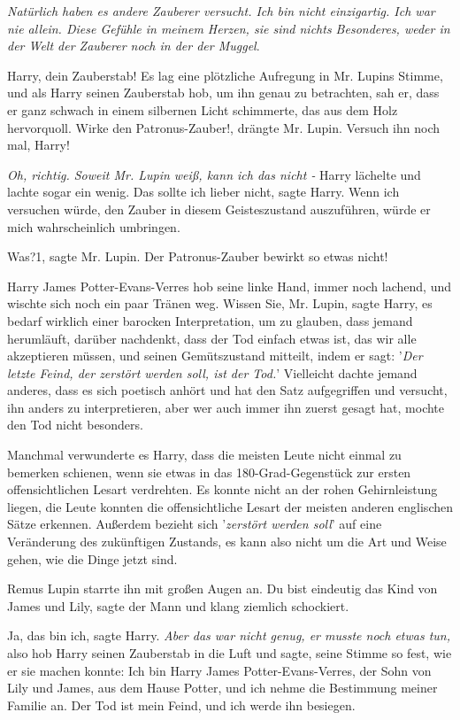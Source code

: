 \emph{Natürlich haben es andere Zauberer versucht. Ich bin nicht einzigartig.
Ich war nie allein. Diese Gefühle in meinem Herzen, sie sind nichts Besonderes,
weder in der Welt der Zauberer noch in der der Muggel}.

\glqq{}Harry, dein Zauberstab!\grqq{} Es lag eine plötzliche Aufregung in Mr.
Lupins Stimme, und als Harry seinen Zauberstab hob, um ihn genau zu betrachten,
sah er, dass er ganz schwach in einem silbernen Licht schimmerte, das aus dem
Holz hervorquoll. \glqq{}Wirke den Patronus-Zauber!\grqq{}, drängte Mr. Lupin.
\glqq{}Versuch ihn noch mal, Harry!\grqq{}

\emph{Oh, richtig. Soweit Mr. Lupin weiß, kann ich das nicht -}
Harry lächelte und lachte sogar ein wenig. \glqq{}Das sollte ich lieber
nicht\grqq{}, sagte Harry. \glqq{}Wenn ich versuchen würde, den Zauber in diesem
Geisteszustand auszuführen, würde er mich wahrscheinlich umbringen.\grqq{}

\glqq{}Was?1\grqq{}, sagte Mr. Lupin. \glqq{}Der Patronus-Zauber bewirkt so etwas
nicht!\grqq{}

Harry James Potter-Evans-Verres hob seine linke Hand, immer noch lachend, und
wischte sich noch ein paar Tränen weg. \glqq{}Wissen Sie, Mr. Lupin\grqq{}, sagte
Harry, \glqq{}es bedarf wirklich einer barocken Interpretation, um zu glauben,
dass jemand herumläuft, darüber nachdenkt, dass der Tod einfach etwas ist, das
wir alle akzeptieren müssen, und seinen Gemütszustand mitteilt, indem er sagt:
'\emph{Der letzte Feind, der zerstört werden soll, ist der Tod.}' Vielleicht
dachte jemand anderes, dass es sich poetisch anhört und hat den Satz
aufgegriffen und versucht, ihn anders zu interpretieren, aber wer auch immer ihn
zuerst gesagt hat, mochte den Tod nicht besonders.\grqq{}

Manchmal verwunderte es Harry, dass die meisten Leute nicht einmal zu bemerken
schienen, wenn sie etwas in das 180-Grad-Gegenstück zur ersten offensichtlichen
Lesart verdrehten. Es konnte nicht an der rohen Gehirnleistung liegen, die Leute
konnten die offensichtliche Lesart der meisten anderen englischen Sätze
erkennen. \glqq{}Außerdem bezieht sich '\emph{zerstört werden soll}' auf eine
Veränderung des zukünftigen Zustands, es kann also nicht um die Art und Weise
gehen, wie die Dinge jetzt sind.\grqq{}

Remus Lupin starrte ihn mit großen Augen an. \glqq{}Du bist eindeutig das Kind
von James und Lily\grqq{}, sagte der Mann und klang ziemlich schockiert.

\glqq{}Ja, das bin ich\grqq{}, sagte Harry. \emph{Aber das war nicht genug, er
musste noch etwas tun,} also hob Harry seinen Zauberstab in die Luft und sagte,
seine Stimme so fest, wie er sie machen konnte: \glqq{}Ich bin Harry James
Potter-Evans-Verres, der Sohn von Lily und James, aus dem Hause Potter, und ich
nehme die Bestimmung meiner Familie an. Der Tod ist mein Feind, und ich werde
ihn besiegen.\grqq{}

